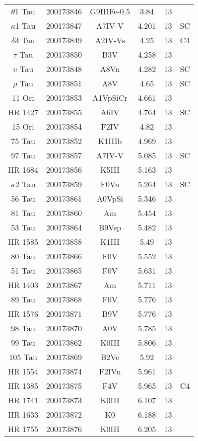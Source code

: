 \begin{table*}
\begin{tabular}{cccccc}
$\theta$1 Tau & 200173846 & G9IIIFe-0.5 & 3.84 & 13 &  \\
$\kappa$1 Tau & 200173847 & A7IV-V & 4.201 & 13 & SC \\
$\delta$3 Tau & 200173849 & A2IV-Vs & 4.25 & 13 & C4 \\
$\tau$ Tau & 200173850 & B3V & 4.258 & 13 &  \\
$\upsilon$ Tau & 200173848 & A8Vn & 4.282 & 13 & SC \\
$\rho$ Tau & 200173851 & A8V & 4.65 & 13 & SC \\
11 Ori & 200173853 & A1VpSiCr & 4.661 & 13 &  \\
HR 1427 & 200173855 & A6IV & 4.764 & 13 & SC \\
15 Ori & 200173854 & F2IV & 4.82 & 13 &  \\
75 Tau & 200173852 & K1IIIb & 4.969 & 13 &  \\
97 Tau & 200173857 & A7IV-V & 5.085 & 13 & SC \\
HR 1684 & 200173856 & K5III & 5.163 & 13 &  \\
$\kappa$2 Tau & 200173859 & F0Vn & 5.264 & 13 & SC \\
56 Tau & 200173861 & A0VpSi & 5.346 & 13 &  \\
81 Tau & 200173860 & Am & 5.454 & 13 &  \\
53 Tau & 200173864 & B9Vsp & 5.482 & 13 &  \\
HR 1585 & 200173858 & K1III & 5.49 & 13 &  \\
80 Tau & 200173866 & F0V & 5.552 & 13 &  \\
51 Tau & 200173865 & F0V & 5.631 & 13 &  \\
HR 1403 & 200173867 & Am & 5.711 & 13 &  \\
89 Tau & 200173868 & F0V & 5.776 & 13 &  \\
HR 1576 & 200173871 & B9V & 5.776 & 13 &  \\
98 Tau & 200173870 & A0V & 5.785 & 13 &  \\
99 Tau & 200173862 & K0III & 5.806 & 13 &  \\
105 Tau & 200173869 & B2Ve & 5.92 & 13 &  \\
HR 1554 & 200173874 & F2IVn & 5.961 & 13 &  \\
HR 1385 & 200173875 & F4V & 5.965 & 13 & C4 \\
HR 1741 & 200173873 & K0III & 6.107 & 13 &  \\
HR 1633 & 200173872 & K0 & 6.188 & 13 &  \\
HR 1755 & 200173876 & K0III & 6.205 & 13 &  \\

\end{tabular}
\end{table*}
